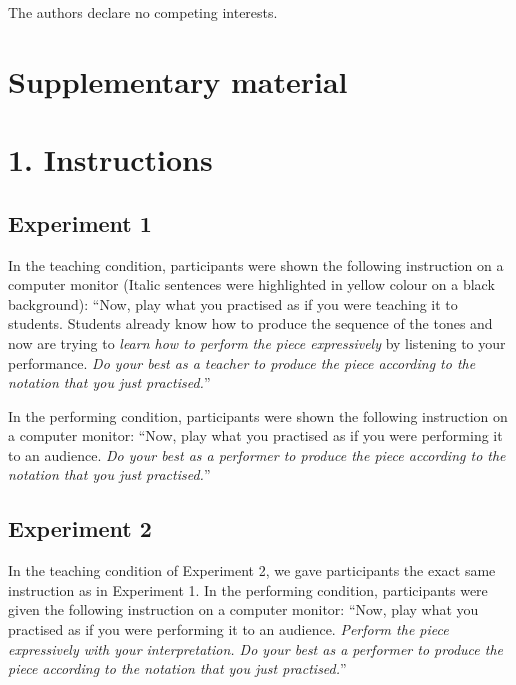 \documentclass[
  man,floatsintext]{apa6}
\begin{document}
The authors declare no competing interests.

\clearpage

\hypertarget{supplementary}{%
\section{Supplementary material}\label{supplementary}}

\hypertarget{instructions}{%
\section{1. Instructions}\label{instructions}}

\hypertarget{experiment-1-1}{%
\subsection{Experiment 1}\label{experiment-1-1}}

In the teaching condition, participants were shown the following instruction on a computer monitor (Italic sentences were highlighted in yellow colour on a black background): ``Now, play what you practised as if you were teaching it to students. Students already know how to produce the sequence of the tones and now are trying to \emph{learn how to perform the piece expressively} by listening to your performance. \emph{Do your best as a teacher to produce the piece according to the notation that you just practised.}''

In the performing condition, participants were shown the following instruction on a computer monitor: ``Now, play what you practised as if you were performing it to an audience. \emph{Do your best as a performer to produce the piece according to the notation that you just practised.}''

\hypertarget{experiment-2-1}{%
\subsection{Experiment 2}\label{experiment-2-1}}

In the teaching condition of Experiment 2, we gave participants the exact same instruction as in Experiment 1. In the performing condition, participants were given the following instruction on a computer monitor: ``Now, play what you practised as if you were performing it to an audience. \emph{Perform the piece expressively with your interpretation. Do your best as a performer to produce the piece according to the notation that you just practised.}''
\end{document}
